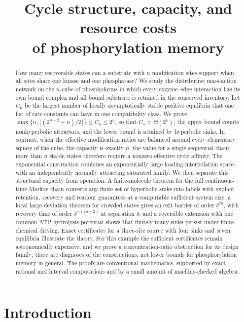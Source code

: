 \documentclass[11pt]{article}
\title{Cycle structure, capacity, and resource costs\\ of phosphorylation memory}
\author{}
\date{}
\theoremstyle{plain}
\theoremstyle{definition}
\theoremstyle{remark}
\numberwithin{equation}{section}
\begin{document}
\maketitle

\begin{abstract}
How many recoverable states can a substrate with \(n\) modification sites support when all
sites share one kinase and one phosphatase? We study the distributive mass-action network on
the \(n\)-cube of phosphoforms in which every enzyme--edge interaction has its own bound
complex and all bound substrate is retained in the conserved inventory. Let \(C_n\) be the
largest number of locally asymptotically stable positive equilibria that one list of rate
constants can have in one compatibility class. We prove
\(\max\{n,\lfloor(2^{n-2}+n)/2\rfloor\}\le C_n\le 2^n\), so that \(C_n=\Theta(2^n)\); the upper
bound counts nonhyperbolic attractors, and the lower bound is attained by hyperbolic sinks. In
contrast, when the effective modification ratios are balanced around every elementary square
of the cube, the capacity is exactly \(n\), the value for a single sequential chain; more than
\(n\) stable states therefore require a nonzero effective cycle affinity. The exponential
construction combines an exponentially large loading-interpolation space with an
independently normally attracting saturated family. We then separate this structural capacity
from operation. A finite-molecule theorem for the full continuous-time Markov chain converts
any finite set of hyperbolic sinks into labels with explicit retention, recovery and readout
guarantees at a computable sufficient system size; a local large-deviation theorem for crowded
states gives an exit barrier of order \(\delta^{2n}\), with recovery time of order
\(\delta^{-(2n-2)}\) at separation \(\delta\); and a reversible extension with one common
ATP-hydrolysis potential shows that finitely many sinks persist under finite chemical driving.
Exact certificates for a three-site source with four sinks and seven equilibria illustrate the
theory. For this example the sufficient certificates remain astronomically expensive, and we
prove a concentration-ratio obstruction for its design family; these are diagnoses of the
constructions, not lower bounds for phosphorylation memory in general. The proofs are
conventional mathematics, supported by exact rational and interval computations and by a small
amount of machine-checked algebra.
\end{abstract}

\section{Introduction}\label{sec:intro}
\end{document}
